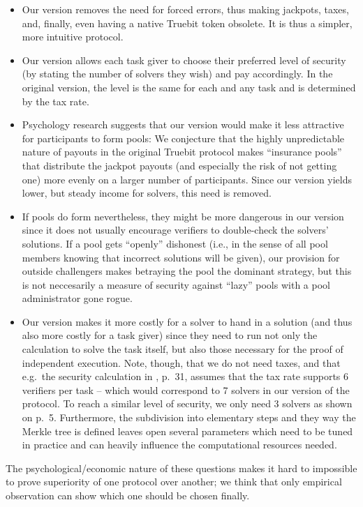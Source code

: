 \documentclass[a4paper]{article}
\begin{document}
\begin{itemize}
\item Our version removes the need for forced errors, thus making jackpots, taxes, and, finally, even having a native Truebit token obsolete. It is thus a simpler, more intuitive protocol. 
\item Our version allows each task giver to choose their preferred level of security (by stating the number of solvers they wish) and pay accordingly. In the original version, the level is the same for each and any task and is determined by the tax rate. 
\item Psychology research suggests that our version would make it less attractive for participants to form pools: We conjecture that the highly unpredictable nature of payouts in the original Truebit protocol makes ``insurance pools'' that distribute the jackpot payouts (and especially the risk of not getting one) more evenly on a larger number of participants. Since our version yields lower, but steady income for solvers, this need is removed. 
\item If pools do form nevertheless, they might be more dangerous in our version since it does not usually encourage verifiers to double-check the solvers' solutions. If a pool gets ``openly'' dishonest (i.e., in the sense of all pool members knowing that incorrect solutions will be given), our provision for outside challengers makes betraying the pool the dominant strategy, but this is not neccesarily  a measure of security against ``lazy'' pools with a pool administrator gone rogue. 
\item Our version makes it more costly for a solver to hand in a solution (and thus also more costly for a task giver) since they need to run not only the calculation to solve the task itself, but also those necessary for the proof of independent execution. Note, though, that we do not need taxes, and that e.g.\ the security calculation in \cite{truebit}, p.~31, assumes that the tax rate supports 6 verifiers per task -- which would correspond to 7 solvers in our version of the protocol. To reach a similar level of security, we only need 3 solvers as shown on p.~5. Furthermore, the subdivision into elementary steps and they way the Merkle tree is defined leaves open several parameters which need to be tuned in practice and can heavily influence the computational resources needed.
\end{itemize}

The psychological/economic nature of these questions makes it hard to impossible to prove superiority of one protocol over another; we think that only empirical observation can show which one should be chosen finally.




\end{document}
